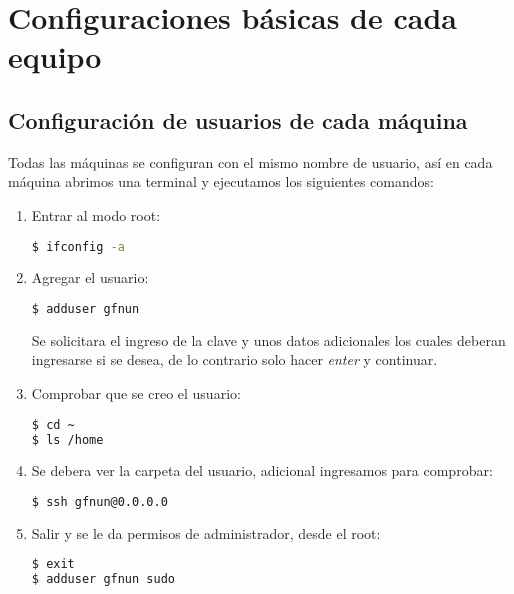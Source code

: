 \section{Configuraciones básicas de cada equipo}

\subsection{Configuración de usuarios de cada máquina}
Todas las máquinas se configuran con el mismo nombre de usuario, así en cada máquina
abrimos una terminal y ejecutamos los siguientes comandos:

\begin{enumerate}
    \item Entrar al modo root:
    
\begin{lstlisting}[language=bash, style=mystyle]
$ ifconfig -a
\end{lstlisting} 


    \item Agregar el usuario:
    
\begin{lstlisting}[language=bash, style=mystyle]
$ adduser gfnun
\end{lstlisting} 

Se solicitara el ingreso de la clave y unos datos adicionales los cuales deberan
ingresarse si se desea, de lo contrario solo hacer \textit{enter} y continuar.
    

    \item Comprobar que se creo el usuario:
    
\begin{lstlisting}[language=bash, style=mystyle]
$ cd ~
$ ls /home
\end{lstlisting}

    \item Se debera ver la carpeta del usuario, adicional ingresamos para comprobar:
    
\begin{lstlisting}[language=bash, style=mystyle]
$ ssh gfnun@0.0.0.0
\end{lstlisting}

    \item Salir y se le da permisos de administrador, desde el root:
    
\begin{lstlisting}[language=bash, style=mystyle]
$ exit
$ adduser gfnun sudo
\end{lstlisting}
    
\end{enumerate}



